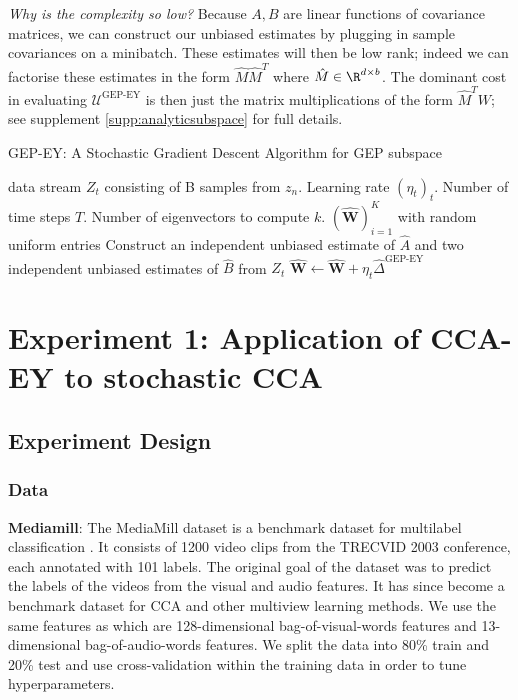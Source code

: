 \textit{Why is the complexity so low?} Because $A,B$ are linear functions of covariance matrices, we can construct our unbiased estimates by plugging in sample covariances on a minibatch.
These estimates will then be low rank; indeed we can factorise these estimates in the form $\hat{M} \hat{M}^T$ where $\hat{M} \in \R^{d \times b}$. The dominant cost in evaluating $\mathcal{U}^\text{GEP-EY}$ is then just the matrix multiplications of the form $\hat{M}^T W$; see supplement \ref{supp:analyticsubspace} for full details.

\begin{algorithm}
    \caption{GEP-EY: A Stochastic Gradient Descent Algorithm for GEP subspace}
    \label{alg:Delta}
    \begin{algorithmic}
         data stream $Z_t$ consisting of B samples from $z_n$. Learning rate $(\eta_t)_t$. Number of time steps $T$. Number of eigenvectors to compute $k$.
         $(\hat{\mathbf {W}})_{i=1}^K$ with random uniform entries
        \STATE Construct an independent unbiased estimate of $\hat{A}$ and two independent unbiased estimates of $\hat{B}$ from $Z_t$
        \STATE $\hat{\mathbf {W}} \leftarrow \hat{\mathbf {W}}+\eta_{t} \hat{\Delta}^{\text{GEP-EY}}$
        \ENDFOR
    \end{algorithmic}
\end{algorithm}

\section{Experiment 1: Application of CCA-EY to stochastic CCA}

\subsection{Experiment Design}

\subsubsection{Data}
\textbf{Mediamill}: The MediaMill dataset \citep{feng2004context} is a benchmark dataset for multilabel classification
. It consists
of 1200 video clips from the TRECVID 2003 conference, each annotated with 101 labels. The original goal of the dataset was to predict the labels of the videos from the visual and audio features. It has since become a benchmark dataset for CCA and other multiview learning methods. We use the same features as \citep{gemp2022generalized} which are 128-dimensional bag-of-visual-words features and 13-dimensional bag-of-audio-words features. We split the data into 80\% train and 20\% test and use cross-validation within the training data in order to tune hyperparameters.

